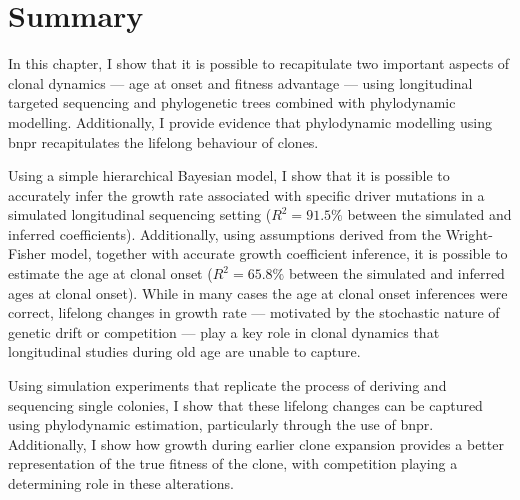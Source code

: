 \begin{figure}[!ht]
	\label{fig:compare-phylo-traj-heatmap}
\end{figure}

\section{Summary}

In this chapter, I show that it is possible to recapitulate two important aspects of clonal dynamics --- age at onset and fitness advantage --- using longitudinal targeted sequencing and phylogenetic trees combined with phylodynamic modelling. Additionally, I provide evidence that phylodynamic modelling using \ac{bnpr} recapitulates the lifelong behaviour of clones.

Using a simple hierarchical Bayesian model, I show that it is possible to accurately infer the growth rate associated with specific driver mutations in a simulated longitudinal sequencing setting ($R^2 = 91.5\%$ between the simulated and inferred coefficients). Additionally, using assumptions derived from the Wright-Fisher model, together with accurate growth coefficient inference, it is possible to estimate the age at clonal onset ($R^2 = 65.8\%$ between the simulated and inferred ages at clonal onset). While in many cases the age at clonal onset inferences were correct, lifelong changes in growth rate --- motivated by the stochastic nature of genetic drift or competition --- play a key role in clonal dynamics that longitudinal studies during old age are unable to capture.

Using simulation experiments that replicate the process of deriving and sequencing single colonies, I show that these lifelong changes can be captured using phylodynamic estimation, particularly through the use of \ac{bnpr}. Additionally, I show how growth during earlier clone expansion provides a better representation of the true fitness of the clone, with competition playing a determining role in these alterations.

